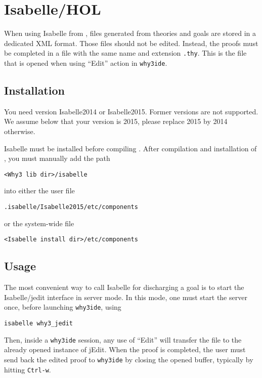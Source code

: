 \section{Isabelle/HOL}
\label{sec:isabelle}


When using Isabelle from \why, files generated from \why theories and
goals are stored in a dedicated XML format. Those files should not be
edited. Instead, the proofs must be completed in a file with the same
name and extension \texttt{.thy}. This is the file that is opened when
using ``Edit'' action in \texttt{why3ide}.

\subsection{Installation}

You need version Isabelle2014 or Isabelle2015. Former versions are not
supported. We assume below that your version is 2015, please replace
2015 by 2014 otherwise.

Isabelle must be installed before compiling \why. After compilation
and installation of \why, you must manually add the path
\begin{verbatim}
<Why3 lib dir>/isabelle
\end{verbatim}
into either the user file
\begin{verbatim}
.isabelle/Isabelle2015/etc/components
\end{verbatim}
or the system-wide file
\begin{verbatim}
<Isabelle install dir>/etc/components
\end{verbatim}

\subsection{Usage}

The most convenient way to call Isabelle for discharging a \why goal
is to start the Isabelle/jedit interface in server mode. In this mode,
one must start the server once, before launching \texttt{why3ide},
using
\begin{verbatim}
isabelle why3_jedit
\end{verbatim}
Then, inside a \texttt{why3ide} session, any use of ``Edit'' will
transfer the file to the already opened instance of jEdit. When the
proof is completed, the user must send back the edited proof to
\texttt{why3ide} by closing the opened buffer, typically by hitting
\texttt{Ctrl-w}.

